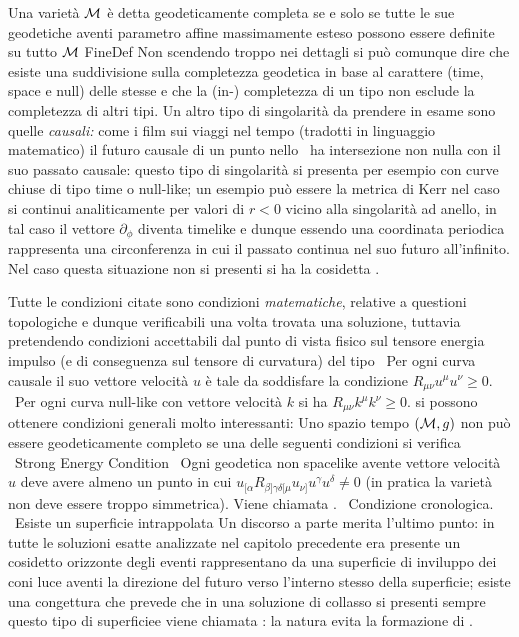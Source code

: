 Una variet\`a ${\cal M}$ \`e detta geodeticamente completa se e solo se tutte le sue geodetiche aventi parametro affine massimamente esteso possono essere definite su tutto ${\cal M}$
FineDef
Non scendendo troppo nei dettagli si pu\`o comunque dire che esiste una sud\-di\-vi\-sio\-ne sulla completezza geodetica in base al carattere (time, space e null) delle stesse e che la (in-) completezza di un tipo non esclude la completezza di altri tipi. Un altro tipo di singolarit\`a da prendere in esame sono quelle {\sl causali:} come i film sui viaggi nel tempo (tradotti in linguaggio matematico) il futuro causale di un punto nello \ST\ ha intersezione non nulla con il suo passato causale: questo tipo di singolarit\`a si presenta per esempio con curve chiuse di tipo time o null-like; un esempio pu\`o essere la metrica di Kerr nel caso si continui analiticamente per valori di $r<0$ vicino alla singolarit\`a ad anello, in tal caso il vettore $\partial_\phi$ diventa timelike e dunque essendo una coordinata periodica rappresenta una circonferenza in cui il passato continua nel suo futuro all'infinito. Nel caso questa situazione non si presenti si ha la cosidetta .\par
Tutte le condizioni citate sono condizioni {\sl matematiche}, relative a questioni to\-po\-lo\-gi\-che e dunque verificabili una volta trovata una soluzione, tuttavia pretendendo condizioni accettabili dal punto di vista fisico sul tensore energia impulso (e di con\-se\-guen\-za sul tensore di curvatura) del tipo
\bigskip
{}\ Per ogni curva causale il suo vettore velocit\`a $u$ \`e tale da soddisfare la condizione  $R_{\mu\nu}u^\mu u^\nu\geq0$.
\ Per ogni curva null-like con vettore velocit\`a $k$ si ha $R_{\mu\nu}k^\mu k^\nu\geq0$.
\bigskip\noindent
si possono ottenere condizioni generali  molto interessanti:\bigskip
\noindent{}
Uno spazio tempo $({\cal M},g)$ non pu\`o essere geodeticamente completo se una delle se\-guen\-ti condizioni si verifica
\bigskip
\Item{}\ Strong Energy Condition 
\Item{}\ Ogni geodetica non spacelike avente vettore velocit\`a $u$ deve avere almeno un punto in cui $u_{[\alpha}R_{\beta]\gamma\delta[\mu}u_{\nu]}u^\gamma u^\delta\neq0$ (in pratica la variet\`a non deve essere troppo simmetrica). Viene chiamata .
\Item{}\ Condizione cronologica.
\Item{}\ Esiste un superficie intrappolata\hfill
\bigskip
\noindent\line{\hrulefill}
Un discorso a parte merita l'ultimo punto: in tutte le soluzioni esatte analizzate nel capitolo precedente era presente un cosidetto orizzonte degli eventi rappresentano da una superficie di inviluppo dei coni luce aventi la direzione del futuro verso l'interno stesso della superficie; esiste una congettura che prevede che in una soluzione di collasso si presenti sempre questo tipo di superficiee viene chiamata : la natura evita la formazione di .\par
